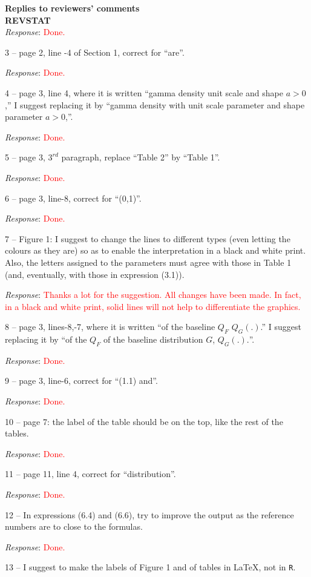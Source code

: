\documentclass[version=last,12pt,{"maintainersDelight"}]{scrlttr2}
\begin{document}
\begin{letter}{\textbf{Replies to reviewers' comments}\\\textbf{REVSTAT}\\}
\emph{Response}: \textcolor{red}{Done.}

3 -- page 2, line -4 of Section 1, correct for ``are''.

\emph{Response}: \textcolor{red}{Done.}

4 -- page 3, line 4, where it is written ``gamma density unit scale and shape \(a>0\),'' I suggest replacing it by ``gamma density with unit scale parameter and shape parameter \(a>0\),''.

\emph{Response}: \textcolor{red}{Done.}

5 -- page 3, \(3^{rd}\) paragraph, replace ``Table 2'' by ``Table 1''.

\emph{Response}: \textcolor{red}{Done.}

6 -- page 3, line-8, correct for ``(0,1)''.

\emph{Response}: \textcolor{red}{Done.}

7 -- Figure 1: I suggest to change the lines to different types (even letting the colours as they are) so as to enable the interpretation in a black and white print. Also, the letters assigned to the parameters must agree with those in Table 1 (and, eventually, with those in expression (3.1)).

\emph{Response}:
\textcolor{red}{Thanks a lot for the suggestion. All changes have been made. In fact, in a black and white print, solid lines will not help to differentiate the graphics.}

8 -- page 3, lines-8,-7, where it is written ``of the baseline \(Q_F\) \(Q_G(.)\).'' I suggest replacing it by ``of the \(Q_F\) of the baseline distribution \(G\), \(Q_G(.).\)''.

\emph{Response}: \textcolor{red}{Done.}

9 -- page 3, line-6, correct for ``(1.1) and''.

\emph{Response}: \textcolor{red}{Done.}

10 -- page 7: the label of the table should be on the top, like the rest of the tables.

\emph{Response}: \textcolor{red}{Done.}

11 -- page 11, line 4, correct for ``distribution''.

\emph{Response}: \textcolor{red}{Done.}

12 -- In expressions (6.4) and (6.6), try to improve the output as the reference numbers are to close to the formulas.

\emph{Response}: \textcolor{red}{Done.}

13 -- I suggest to make the labels of Figure 1 and of tables in \LaTeX, not in \texttt{R}.


\end{letter}
\end{document}
